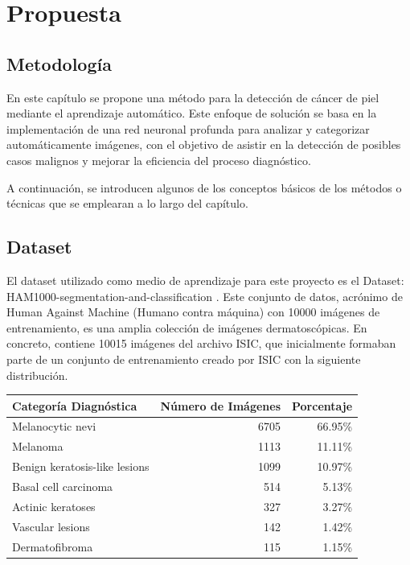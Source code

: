 \chapter{Propuesta}\label{chapter:proposal}

\section{Metodología}\label{sec:method}
En este capítulo se propone una método para la detección de cáncer de piel mediante el aprendizaje automático. Este enfoque de solución se basa en la implementación de una  red neuronal profunda para analizar y categorizar automáticamente imágenes, con el objetivo de asistir en la detección de posibles casos malignos y mejorar la eficiencia del proceso diagnóstico.

A continuación, se introducen algunos de los conceptos básicos de los métodos o técnicas que se emplearan a lo largo del capítulo.
\section{Dataset}

El dataset utilizado como medio de aprendizaje para este proyecto es el Dataset: HAM1000-segmentation-and-classification  . 
Este conjunto de datos, acrónimo de Human Against Machine (Humano contra máquina) con 10000 imágenes de entrenamiento, es una amplia colección de imágenes dermatoscópicas. En concreto, contiene 10015 imágenes del archivo ISIC, que inicialmente formaban parte de un conjunto de entrenamiento creado por ISIC  con la siguiente distribución.\\

\begin{tabular}{lrr}
   \hline
   \textbf{Categoría Diagnóstica} & \textbf{Número de Imágenes} & \textbf{Porcentaje} \\
   \hline
   Melanocytic nevi               & 6705                        & 66.95\%             \\
   Melanoma                       & 1113                        & 11.11\%             \\
   Benign keratosis-like lesions  & 1099                        & 10.97\%             \\
   Basal cell carcinoma           & 514                         & 5.13\%              \\
   Actinic keratoses              & 327                         & 3.27\%              \\
   Vascular lesions               & 142                         & 1.42\%              \\
   Dermatofibroma                 & 115                         & 1.15\%              \\
   \hline
   \end{tabular}

